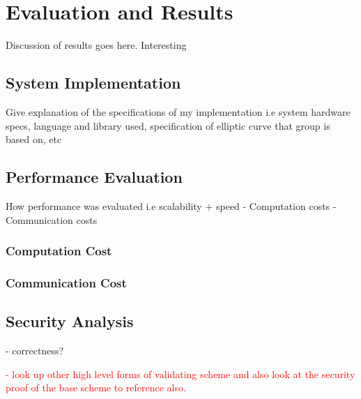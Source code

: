 \chapter{Evaluation and Results}
\label{chap:evaluation_and_results}

Discussion of results goes here. Interesting

\section{System Implementation}

Give explanation of the specifications of my implementation i.e system hardware specs, language and library used, specification of elliptic curve that group is based on, etc


\section{Performance Evaluation}

	How performance was evaluated i.e scalability + speed
- Computation costs
- Communication costs

\subsection{Computation Cost}


\subsection{Communication Cost}


\section{Security Analysis}

- correctness? 

\textcolor{red}{- look up other high level forms of validating scheme and also look at the security proof of the base scheme to reference also.}